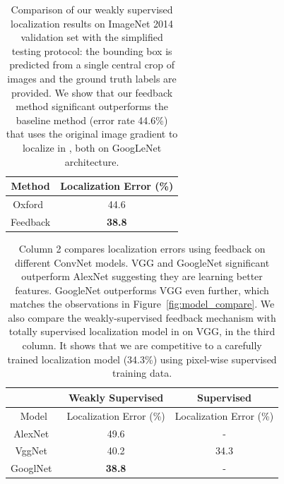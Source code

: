 \begin{table}[htb]
\centering
\small
\begin{tabular}{|c|c|}
\hline
Method & Localization Error (\%) \\ \hline
Oxford~\cite{simonyan2013deep} & 44.6 \\ \hline
Feedback & \textbf{38.8} \\ \hline
\end{tabular}
\caption{Comparison of our weakly supervised localization results on ImageNet 2014 validation set with the simplified testing protocol: the bounding box is predicted from a single central crop of images and the ground truth labels are provided.
We show that our feedback method significant outperforms the baseline method (error rate 44.6\%) that uses the original image gradient to localize in \cite{simonyan2013deep}, both on GoogLeNet architecture.
}
\label{tab:localization_accuracy}
\end{table}

\begin{table}[htb]
\centering
\small
\begin{tabular}{c|c|c}
\hline
                                      & Weakly Supervised             & Supervised              \\ \hline
Model                                 & Localization Error (\%)       & Localization Error (\%) \\ \hline
AlexNet~\cite{Krizhevsky2012ImageNet} & 49.6                          & -                       \\ \hline
VggNet~\cite{Simonyan2014Very}        & 40.2                          & 34.3\cite{Simonyan2014Very} \\ \hline
GooglNet~\cite{Szegedy2014Going}      & \textbf{38.8}                 & - \\ \hline
\end{tabular}
\caption{Column 2 compares localization errors using feedback on different ConvNet models. VGG and GoogleNet significant outperform AlexNet suggesting they are learning better features. GoogleNet outperforms VGG even further, which matches the observations in Figure~\ref{fig:model_compare}. We also compare the weakly-supervised feedback mechanism with totally supervised localization model in \cite{Simonyan2014Very} on VGG, in the third column. It shows that we are competitive to a carefully trained localization model (34.3\%) using pixel-wise supervised training data.}
\label{tab:localization_model_compare}
\end{table}

